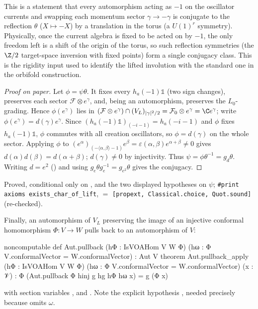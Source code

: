 \begin{physics}
This is a statement that every automorphism acting as $-1$ on the oscillator currents and swapping each momentum sector $\gamma\to-\gamma$ is conjugate to the reflection $\theta$ ($X\mapsto-X$) by a translation in the torus (a $U(1)^r$ symmetry). Physically, once the current algebra is fixed to be acted on by $-1$, the only freedom left is a shift of the origin of the torus, so such reflection symmetries (the $\Z/2$ target-space inversion with fixed points) form a single conjugacy class. This is the rigidity input used to identify the lifted involution with the standard one in the orbifold construction.
\end{physics}

\begin{proof}[Proof on paper]
Let $\phi=\psi\theta$. It fixes every $h_a(-1)\mathbb 1$ (two sign changes), preserves each sector
$\mathcal F\otimes e^\gamma$, and, being an automorphism, preserves the $L_0$-grading. Hence
$\phi(e^\gamma)$ lies in $(\mathcal F\otimes e^\gamma)\cap(V_L)_{|\gamma|^2/2}=\mathcal F_0\otimes
e^\gamma=\C e^\gamma$; write $\phi(e^\gamma)=d(\gamma)e^\gamma$. Since $(h_a(-1)\mathbb
1)_{(-i-1)}=h_a(-i-1)$ and $\phi$ fixes $h_a(-1)\mathbb 1$, $\phi$ commutes with all creation
oscillators, so $\phi=d(\gamma)$ on the whole sector. Applying $\phi$ to
$(e^\alpha)_{(-\langle\alpha,\beta\rangle-1)}e^\beta=\varepsilon(\alpha,\beta)e^{\alpha+\beta}\neq0$
gives $d(\alpha)d(\beta)=d(\alpha+\beta)$; $d(\gamma)\neq0$ by injectivity. Thus $\psi=\phi\theta^{-1}
=g_d\theta$. Writing $d=e^2$ () and using $g_e\theta g_e^{-1}=g_{e^2}\theta$
gives the conjugacy.
\end{proof}

\begin{status}
Proved, conditional only on ,  and the two displayed hypotheses on $\psi$;
\texttt{\#print axioms exists\_char\_of\_lift},  $=$
\texttt{[propext, Classical.choice, Quot.sound]} (re-checked).
\end{status}

Finally, an automorphism of $V_L$ preserving the image of an injective conformal homomorphism
$\Phi\colon V\to W$ pulls back to an automorphism of $V$:
\begin{leancode}
noncomputable def Aut.pullback (hΦ : IsVOAHom V W Φ)
    (hω : Φ V.conformalVector = W.conformalVector) : Aut V
theorem Aut.pullback_apply (hΦ : IsVOAHom V W Φ)
    (hω : Φ V.conformalVector = W.conformalVector) (x : 𝒱) :
    Φ (Aut.pullback Φ hinj g hg hΦ hω x) = g (Φ x)
\end{leancode}
with section variables ,  and
. Note the
explicit hypothesis , needed precisely because  omits $\omega$.

